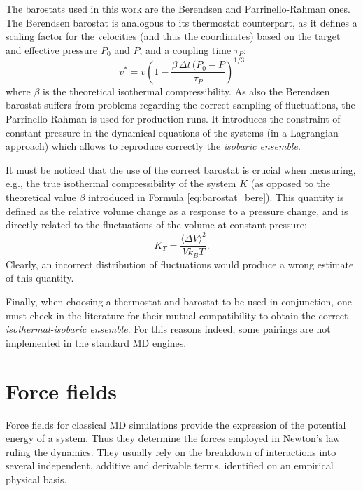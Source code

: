 The barostats used in this work are the Berendsen \citep{Berendsen1984} and Parrinello-Rahman \citep{Parrinello1981} ones. The Berendsen barostat is analogous to its thermostat counterpart, as it defines a scaling factor for the velocities (and thus the coordinates) based on the target and effective pressure $P_0$ and $P$, and a coupling time $\tau_P$:
\begin{equation} \label{eq:barostat_bere}
    v^* = v \left( 1 - \frac{\beta \, \Delta t \, (P_0 - P}{\tau_P} \right)^{1/3}
\end{equation}
where $\beta$ is the theoretical isothermal compressibility. As also the Berendsen barostat suffers from problems regarding the correct sampling of fluctuations, the Parrinello-Rahman is used for production runs. It introduces the constraint of constant pressure in the dynamical equations of the systems (in a Lagrangian approach) which allows to reproduce correctly the \emph{isobaric ensemble}.

It must be noticed that the use of the correct barostat is crucial when measuring, e.g., the true isothermal compressibility of the system $K$ (as opposed to the theoretical value $\beta$ introduced in Formula \ref{eq:barostat_bere}). This quantity is defined as the relative volume change as a response to a pressure change, and is directly related to the fluctuations of the volume at constant pressure:
\begin{equation}
K_T = \frac{\langle \Delta V \rangle ^2}{Vk_BT}.
\end{equation}
Clearly, an incorrect distribution of fluctuations would produce a wrong estimate of this quantity.

Finally, when choosing a thermostat and barostat to  be used in conjunction, one must check in the literature for their mutual compatibility to obtain the correct \emph{isothermal-isobaric ensemble}. For this reasons indeed, some pairings are not implemented in the standard MD engines.


\section{Force fields}

Force fields for classical MD simulations provide the expression of the potential energy of a system. Thus they determine the forces employed in Newton's law ruling the dynamics.
%
They usually rely on the breakdown of interactions into several independent, additive and derivable terms, identified on an empirical physical basis.

